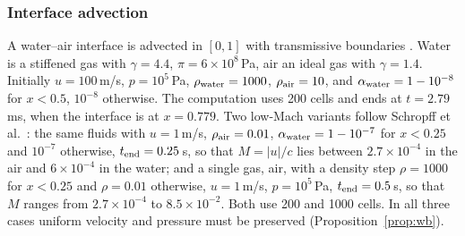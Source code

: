 \subsubsection{Interface advection}
\label{sec:res_interface}
A water--air interface is advected in $[0,1]$ with transmissive boundaries \cite[Sec.~4.1]{SPB2009}. Water is a
stiffened gas with $\gamma=4.4$, $\pi=6\times10^8$\,Pa, air an ideal gas with $\gamma=1.4$. Initially $u=100$\,m/s,
$p=10^5$\,Pa, $\rho_{\rm water}=1000$, $\rho_{\rm air}=10$, and $\alpha_{\rm water}=1-10^{-8}$ for $x<0.5$, $10^{-8}$ otherwise. The
computation uses 200 cells and ends at $t=2.79$\,ms, when the interface is at $x=0.779$. Two low-Mach variants follow
Schropff et al.\ \cite{Schropff2026}: the same fluids with $u=1$\,m/s, $\rho_{\rm air}=0.01$, $\alpha_{\rm water}=1-10^{-7}$ for $x<0.25$ and $10^{-7}$
otherwise, $t_{\rm end}=0.25$\,s, so that $M=|u|/c$ lies between $2.7\times10^{-4}$ in the air and $6\times10^{-4}$ in the water; and a single gas, air, with a density step $\rho=1000$ for $x<0.25$
and $\rho=0.01$ otherwise, $u=1$\,m/s, $p=10^5$\,Pa, $t_{\rm end}=0.5$\,s, so that $M$ ranges from $2.7\times10^{-4}$ to
$8.5\times10^{-2}$. Both use 200 and 1000 cells. In all three cases uniform velocity and pressure must be preserved
(Proposition~\ref{prop:wb}).

